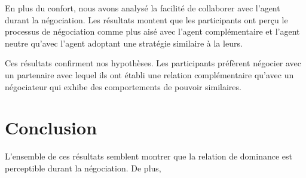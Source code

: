 	En plus du confort, nous avons analysé la facilité de collaborer avec l'agent durant la négociation. Les résultats montent que les participants ont perçu le processus de négociation comme plus aisé avec l'agent complémentaire et l'agent neutre qu'avec l'agent adoptant une stratégie similaire à la leurs. 
	
	Ces résultats confirment nos hypothèses. Les participants préfèrent négocier avec un partenaire avec lequel ils ont établi une relation complémentaire qu'avec un négociateur qui exhibe des comportements de pouvoir similaires. 

	\section{Conclusion}
L'ensemble de ces résultats semblent montrer que la relation de dominance est perceptible durant la négociation. De plus, 